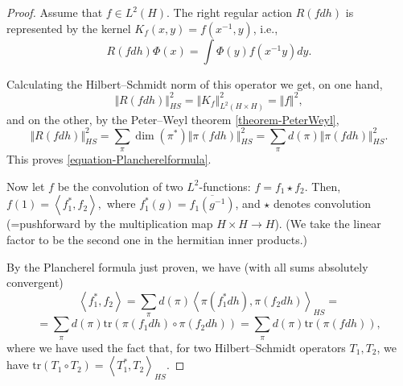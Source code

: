 \begin{proof}
 Assume that $f \in L^2(H)$. The right regular action $R(fdh)$ is represented by the kernel $K_f(x,y) = f(x^{-1},y)$, i.e., 
 $$ R(fdh)\Phi(x) = \int \Phi(y) f(x^{-1}y) dy.$$
 
 Calculating the Hilbert--Schmidt norm of this operator we get, on one hand, 
 $$ \Vert R(fdh)\Vert^2_{HS} = \Vert K_f \Vert_{L^2(H\times H)}^2 = \Vert f \Vert^2,$$
 and on the other, by the Peter--Weyl theorem \ref{theorem-PeterWeyl}, 
 $$ \Vert R(fdh)\Vert^2_{HS} = \sum_\pi \dim(\pi^*) \Vert \pi(fdh)\Vert^2_{HS} = \sum_\pi d(\pi) \Vert \pi(fdh)\Vert^2_{HS}.$$
 This proves \eqref{equation-Plancherelformula}.
 
 Now let $f$ be the convolution of two $L^2$-functions: $f=f_1\star f_2$.  
 Then, $f(1) = \left< f_1^*, f_2\right>,$
 where $f_1^*(g) = \overline{f_1 (g^{-1})}$, and $\star$ denotes convolution (=pushforward by the multiplication map $H\times H\to H$).  (We take the linear factor to be the second one in the hermitian inner products.)
 
 By the Plancherel formula just proven, we have (with all sums absolutely convergent)
 $$\left< f_1^*, f_2\right> = \sum_\pi d(\pi) \left< \pi(f_1^*dh ), \pi(f_2 dh) \right>_{HS} = $$
 $$ = \sum_\pi d(\pi) \text{tr}\left( \pi(f_1 dh ) \circ \pi(f_2 dh)\right) = \sum_\pi d(\pi) \text{tr}\left( \pi(f dh ) \right),$$
 where we have used the fact that, for two Hilbert--Schmidt operators $T_1, T_2$, we have $\text{tr}(T_1 \circ T_2) = \left< T_1^*, T_2\right>_{HS}$.  
\end{proof}

